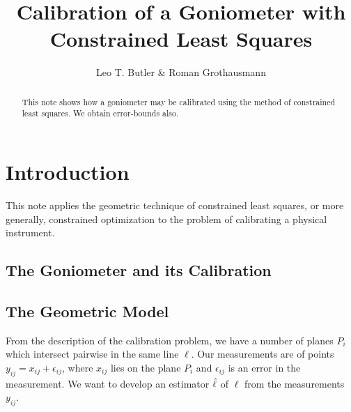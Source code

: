 \documentclass[a4paper,reqno]{amsart}
\title[Goniometer]{Calibration of a Goniometer with Constrained Least
  Squares}
\author{Leo T. Butler \& Roman Grothausmann}
\begin{document}
\begin{abstract}
  This note shows how a goniometer may be calibrated using the method
  of constrained least squares. We obtain error-bounds also.
\end{abstract}

\section{Introduction}
\label{sec:intro}

This note applies the geometric technique of constrained least
squares, or more generally, constrained optimization to the problem of
calibrating a physical instrument.

\subsection{The Goniometer and its Calibration}
\label{sec:goniometer-intro}

\subsection{The Geometric Model}
\label{sec:geometric-model}

From the description of the calibration problem, we have a number of
planes $P_i$ which intersect pairwise in the same line $\ell$. Our
measurements are of points $y_{ij}=x_{ij}+\epsilon_{ij}$, where
$x_{ij}$ lies on the plane $P_i$ and $\epsilon_{ij}$ is an error in
the measurement. We want to develop an estimator $\hat{\ell}$ of
$\ell$ from the measurements $y_{ij}$.
\end{document}
